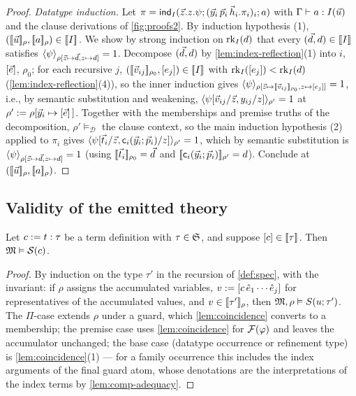 \begin{proof}
\emph{Datatype induction.}  Let $\pi = \mathsf{ind}_{I}(\vec{z}.z.\psi;
(\vec{y}_i\,\vec{p}_i\,\vec{h}_i.\pi_i)_i; a)$ with $\Gamma \vdash a :
I(\vec{u})$ and the clause derivations of \cref{fig:proofs2}.  By
induction hypothesis (1), $([\![ \vec{u} ]\!]_\rho, [\![ a ]\!]_\rho) \in
[\![ I ]\!]_{}$.  We show by strong induction on $\mathrm{rk}_{I}(d)$ that every
$(\vec{d}, d) \in [\![ I ]\!]_{}$ satisfies $\langle \psi \rangle_{\rho[\vec{z} \mapsto
\vec{d}, z \mapsto d]} = 1$.  Decompose $(\vec{d}, d)$ by
\cref{lem:index-reflection}(1) into $i$, $[\vec{e}]$, $\rho_0$; for
each recursive $j$, $([\![ \vec{v}_{ij} ]\!]_{\rho_0}, [e_j]) \in
[\![ I ]\!]_{}$ with $\mathrm{rk}_{I}([e_j]) < \mathrm{rk}_{I}(d)$
(\cref{lem:index-reflection}(4)), so the inner induction gives
$\langle \psi \rangle_{\rho[\vec{z} \mapsto [\![ \vec{v}_{ij} ]\!]_{\rho_0}, z \mapsto
[e_j]]} = 1$, i.e., by semantic substitution and weakening,
$\langle \psi[\vec{v}_{ij}/\vec{z}, y_{ij}/z] \rangle_{\rho'} = 1$ at $\rho' \mathrel{:=}
\rho[\vec{y}_i \mapsto [\vec{e}]\,]$.  Together with the memberships
and premise truths of the decomposition, $\rho' \vDash_{\mathcal{D}}$
the clause context, so the main induction hypothesis (2) applied to
$\pi_i$ gives $\langle \psi[\vec{t}_i/\vec{z},
\mathsf{c}_i(\vec{y}_i;\vec{p}_i)/z] \rangle_{\rho'} = 1$, which by semantic
substitution is $\langle \psi \rangle_{\rho[\vec{z} \mapsto \vec{d}, z \mapsto d]}
= 1$ (using $[\![ \vec{t}_i ]\!]_{\rho_0} = \vec{d}$ and
$[\![ \mathsf{c}_i(\vec{y}_i;\vec{p}_i) ]\!]_{\rho'} = d$).  Conclude at
$([\![ \vec{u} ]\!]_\rho, [\![ a ]\!]_\rho)$.
\end{proof}

\subsection{Validity of the emitted theory}
\label{sec:soundness-validity}

\begin{lemma}
\label{lem:spec-valid}
Let $c \mathrel{:=} t : \tau$ be a term definition with $\tau \in \mathfrak{S}$, and
suppose $[c] \in [\![ \tau ]\!]_{}$.  Then $\mathfrak{M} \vDash \mathcal{S}(c)$.
\end{lemma}

\begin{proof}
By induction on the type $\tau'$ in the recursion of \cref{def:spec},
with the invariant: if
$\rho$ assigns the accumulated variables, $v \mathrel{:=} [c\,\hat{e}_1
\cdots \hat{e}_j]$ for representatives of the accumulated values, and
$v \in [\![ \tau' ]\!]_{\rho}$, then $\mathfrak{M}, \rho \vDash S(u; \tau')$.  The
$\Pi$-case extends $\rho$ under a guard, which \cref{lem:coincidence}
converts to a membership; the premise case uses \cref{lem:coincidence}
for $\mathcal{F}(\varphi)$ and leaves the accumulator unchanged; the base case
(datatype occurrence or refinement type) is \cref{lem:coincidence}(1)
--- for a family occurrence this includes the index arguments of the
final guard atom, whose denotations are the interpretations of the
index terms by \cref{lem:comp-adequacy}.
\end{proof}

